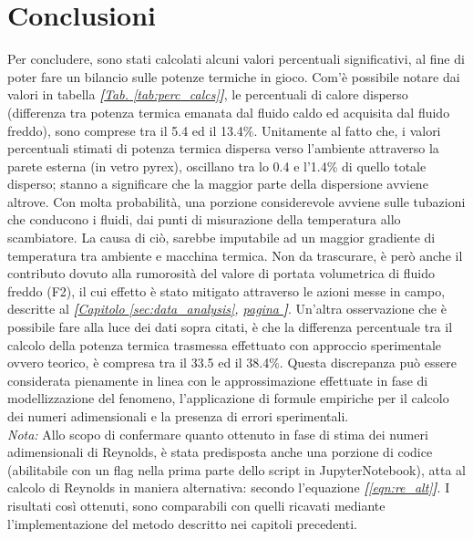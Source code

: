 \documentclass[a4paper,10pt]{article}                                                                                       %
\begin{document}
\section{Conclusioni}                                                                                                       %
\label{sec:conclusions}                                                                                                     %
  Per concludere, sono stati calcolati alcuni valori percentuali significativi, al fine di poter fare un bilancio sulle
  potenze termiche in gioco. Com'è possibile notare dai valori in tabella
  \textit{\textbf{[}\hyperref[tab:perc_calcs]{Tab. }\ref{tab:perc_calcs}\textbf{]}}, le percentuali di calore disperso
  (differenza tra potenza termica emanata dal fluido caldo ed acquisita dal fluido freddo), sono comprese tra il 5.4 ed il
  13.4\%. Unitamente al fatto che, i valori percentuali stimati di potenza termica dispersa verso l'ambiente attraverso la
  parete esterna (in vetro pyrex), oscillano tra lo 0.4 e l'1.4\% di quello totale disperso; stanno a significare che la
  maggior parte della dispersione avviene altrove. Con molta probabilità, una porzione considerevole avviene sulle
  tubazioni che conducono i fluidi, dai punti di misurazione della temperatura allo scambiatore. La causa di ciò, sarebbe
  imputabile ad un maggior gradiente di temperatura tra ambiente e macchina termica. Non da trascurare, è però anche il
  contributo dovuto alla rumorosità del valore di portata volumetrica di fluido freddo (F2), il cui effetto è stato
  mitigato attraverso le azioni messe in campo, descritte al
  \textit{\textbf{[}\hyperref[sec:data_analysis]{Capitolo }\ref{sec:data_analysis},
  \hyperref[sec:data_analysis]{pagina }\pageref{sec:data_analysis}\textbf{]}}. Un'altra osservazione che è possibile fare
  alla luce dei dati sopra citati, è che la differenza percentuale tra il calcolo della potenza termica trasmessa
  effettuato con approccio sperimentale ovvero teorico, è compresa tra il 33.5 ed il 38.4\%. Questa discrepanza può essere
  considerata pienamente in linea con le approssimazione effettuate in fase di modellizzazione del fenomeno, l'applicazione
  di formule empiriche per il calcolo dei numeri adimensionali e la presenza di errori sperimentali.\vspace{2mm}\\
  \textit{Nota:} Allo scopo di confermare quanto ottenuto in fase di stima dei numeri adimensionali di Reynolds, è stata
  predisposta anche una porzione di codice (abilitabile con un flag nella prima parte dello script in JupyterNotebook),
  atta al calcolo di Reynolds in maniera alternativa: secondo l'equazione \textit{\textbf{[}\ref{eqn:re_alt}\textbf{]}}.
  I risultati così ottenuti, sono comparabili con quelli ricavati mediante l'implementazione del metodo descritto nei
  capitoli precedenti.
\clearpage                                                                                                                  %
\end{document}
